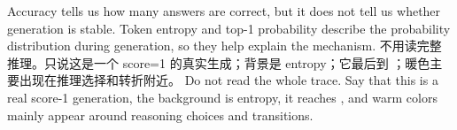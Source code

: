 {}\markdownRendererInterblockSeparator
{}Accuracy tells us how many answers are correct, but it does not tell us whether generation is stable. Token entropy and top-1 probability describe the probability distribution during generation, so they help explain the mechanism.\markdownRendererInterblockSeparator
{}\markdownRendererInterblockSeparator
{}\markdownRendererInterblockSeparator
{}不用读完整推理。只说这是一个 score=1 的真实生成；背景是 entropy；它最后到 ；暖色主要出现在推理选择和转折附近。\markdownRendererInterblockSeparator
{}\markdownRendererInterblockSeparator
{}Do not read the whole trace. Say that this is a real score-1 generation, the background is entropy, it reaches , and warm colors mainly appear around reasoning choices and transitions.\markdownRendererDocumentEnd